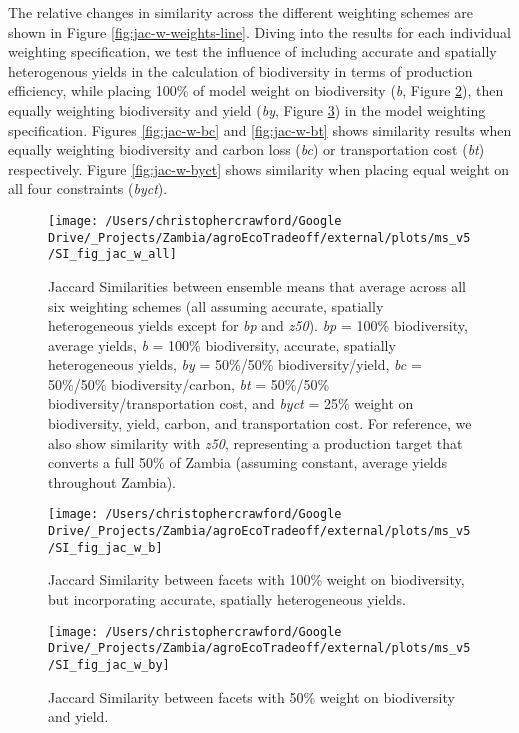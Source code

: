 \documentclass[
]{article}
\begin{document}
The relative changes in similarity across the different weighting schemes are shown in Figure \ref{fig:jac-w-weights-line}. Diving into the results for each individual weighting specification, we test the influence of including accurate and spatially heterogenous yields in the calculation of biodiversity in terms of production efficiency, while placing 100\% of model weight on biodiversity (\emph{b}, Figure \ref{fig:jac-w-b}), then equally weighting biodiversity and yield (\emph{by}, Figure \ref{fig:jac-w-by}) in the model weighting specification. Figures \ref{fig:jac-w-bc} and \ref{fig:jac-w-bt} shows similarity results when equally weighting biodiversity and carbon loss (\emph{bc}) or transportation cost (\emph{bt}) respectively. Figure \ref{fig:jac-w-byct} shows similarity when placing equal weight on all four constraints (\emph{byct}).

\begin{figure}
\texttt{[image: /Users/christophercrawford/Google Drive/\_Projects/Zambia/agroEcoTradeoff/external/plots/ms\_v5/SI\_fig\_jac\_w\_all]} \caption{Jaccard Similarities between ensemble means that average across all six weighting schemes (all assuming accurate, spatially heterogeneous yields except for \emph{bp} and \emph{z50}). \emph{bp} = 100\% biodiversity, average yields, \emph{b} = 100\% biodiversity, accurate, spatially heterogeneous yields, \emph{by} = 50\%/50\% biodiversity/yield, \emph{bc} = 50\%/50\% biodiversity/carbon, \emph{bt} = 50\%/50\% biodiversity/transportation cost, and \emph{byct} = 25\% weight on biodiversity, yield, carbon, and transportation cost. For reference, we also show similarity with \emph{z50}, representing a production target that converts a full 50\% of Zambia (assuming constant, average yields throughout Zambia).}\label{fig:jac-w-all}
\end{figure}

\begin{figure}
\texttt{[image: /Users/christophercrawford/Google Drive/\_Projects/Zambia/agroEcoTradeoff/external/plots/ms\_v5/SI\_fig\_jac\_w\_b]} \caption{Jaccard Similarity between facets with 100\% weight on biodiversity, but incorporating accurate, spatially heterogeneous yields.}\label{fig:jac-w-b}
\end{figure}

\begin{figure}
\texttt{[image: /Users/christophercrawford/Google Drive/\_Projects/Zambia/agroEcoTradeoff/external/plots/ms\_v5/SI\_fig\_jac\_w\_by]} \caption{Jaccard Similarity between facets with 50\% weight on biodiversity and yield.}\label{fig:jac-w-by}
\end{figure}
\end{document}

